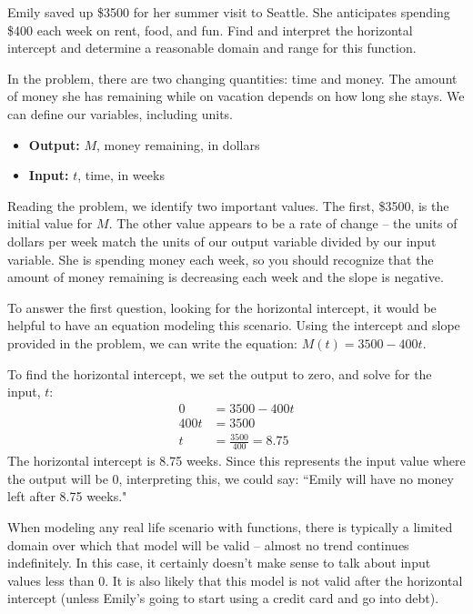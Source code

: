 \begin{example}

Emily saved up \$3500 for her summer visit to Seattle. She anticipates spending \$400 each week on rent, food, and fun. Find and interpret the horizontal intercept and determine a reasonable domain and range for this function.

\begin{solution} In the problem, there are two changing quantities: time and money. The amount of money she has remaining while on vacation depends on how long she stays. We can define our variables, including units.
  \begin{itemize}
    \item[] {\bf Output:} $M$, money remaining, in dollars
    \item[] {\bf Input:} $t$, time, in weeks
  \end{itemize}
Reading the problem, we identify two important values. The first, \$3500, is the initial value for $M$. The other value appears to be a rate of change -- the units of dollars per week match the units of our output variable divided by our input variable. She is spending money each week, so you should recognize that the amount of money remaining is
decreasing each week and the slope is negative.

To answer the first question, looking for the horizontal intercept, it would be helpful to have an equation modeling this scenario. Using the intercept and slope provided in the problem, we can write the equation: $M(t) = 3500-400t$.

To find the horizontal intercept, we set the output to zero, and solve for the input, $t$:
\begin{align*}
  0 &= 3500  - 400 t \\
  400t &= 3500 \\
  t &= \frac{3500}{400} = 8.75
\end{align*}
The horizontal intercept is 8.75 weeks. Since this represents the input value where the output will be $0$, interpreting this, we could say: ``Emily will have no money left after 8.75 weeks."

When modeling any real life scenario with functions, there is typically a limited domain over which that model will be valid -- almost no trend continues indefinitely. In this case, it certainly doesn't make sense to talk about input values less than $0$. It is also likely that this model is not valid after the horizontal intercept (unless Emily's going to start using a credit card and go into debt).


\end{solution}
\end{example}
